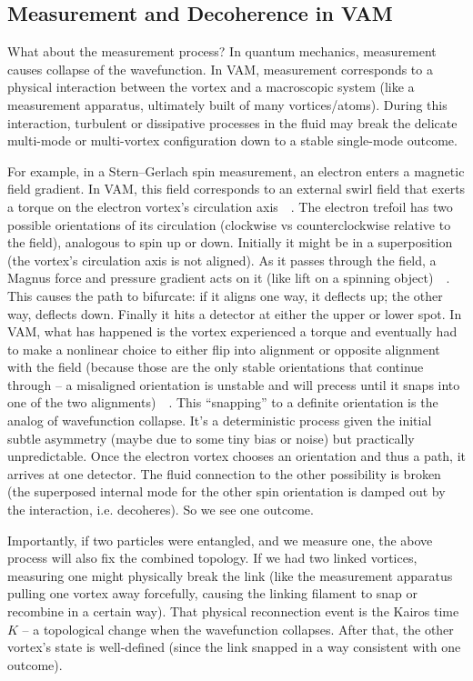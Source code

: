 \documentclass[a4paper,12pt]{article}
\begin{document}
    \subsection{Measurement and Decoherence in VAM}
    What about the measurement process? In quantum mechanics, measurement causes collapse of the wavefunction. In VAM, measurement corresponds to a physical interaction between the vortex and a macroscopic system (like a measurement apparatus, ultimately built of many vortices/atoms). During this interaction, turbulent or dissipative processes in the fluid may break the delicate multi-mode or multi-vortex configuration down to a stable single-mode outcome.

    For example, in a Stern–Gerlach spin measurement, an electron enters a magnetic field gradient. In VAM, this field corresponds to an external swirl field that exerts a torque on the electron vortex’s circulation axis~\cite{reference_109}~\cite{reference_110}. The electron trefoil has two possible orientations of its circulation (clockwise vs counterclockwise relative to the field), analogous to spin up or down. Initially it might be in a superposition (the vortex’s circulation axis is not aligned). As it passes through the field, a Magnus force and pressure gradient acts on it (like lift on a spinning object)~\cite{reference_111}~\cite{reference_112}. This causes the path to bifurcate: if it aligns one way, it deflects up; the other way, deflects down. Finally it hits a detector at either the upper or lower spot. In VAM, what has happened is the vortex experienced a torque and eventually had to make a nonlinear choice to either flip into alignment or opposite alignment with the field (because those are the only stable orientations that continue through – a misaligned orientation is unstable and will precess until it snaps into one of the two alignments)~\cite{reference_113}~\cite{reference_114}. This “snapping” to a definite orientation is the analog of wavefunction collapse. It’s a deterministic process given the initial subtle asymmetry (maybe due to some tiny bias or noise) but practically unpredictable. Once the electron vortex chooses an orientation and thus a path, it arrives at one detector. The fluid connection to the other possibility is broken (the superposed internal mode for the other spin orientation is damped out by the interaction, i.e. decoheres). So we see one outcome.

    Importantly, if two particles were entangled, and we measure one, the above process will also fix the combined topology. If we had two linked vortices, measuring one might physically break the link (like the measurement apparatus pulling one vortex away forcefully, causing the linking filament to snap or recombine in a certain way). That physical reconnection event is the Kairos time $K$ – a topological change when the wavefunction collapses. After that, the other vortex’s state is well-defined (since the link snapped in a way consistent with one outcome).
\end{document}

